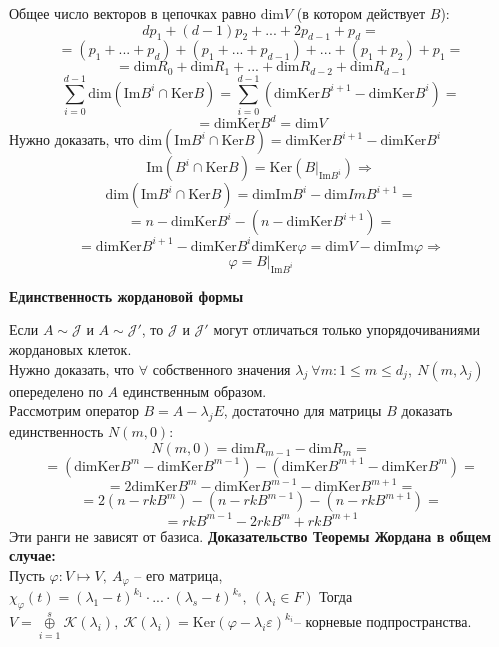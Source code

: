 \documentclass[a4paper, 12pt]{article}
\theoremstyle{definition}
\begin{document}
    Общее число векторов в цепочках равно $\text{dim}V$
    (в котором действует $B$):
    $$dp_1 + (d-1)p_2 + ... + 2p_{d-1} + p_d =$$
    $$ =(p_1 +...+ p_d) + (p_1 + ... + p_{d-1}) +...+ (p_1 + p_2)
    + p_1 = $$
    $$= \text{dim}R_0 + \text{dim}R_1 +...+ \text{dim}R_{d-2}
    + \text{dim}R_{d-1}$$
    $$\sum\limits_{i=0}^{d-1}\text{dim}(\text{Im}B^i \cap 
    \text{Ker}B) = \sum\limits_{i=0}^{d-1}(\text{dimKer}B^
    {i+1} - \text{dimKer}B^i) =$$
    $$= \text{dimKer}B^d = \text{dim}V$$
    Нужно доказать, что $\text{dim}(\text{Im}B^i \cap \text{Ker}B) = 
    \text{dimKer}B^{i+1} - \text{dimKer}B^i$
    $$\text{Im}(B^i \cap \text{Ker}B) = \text{Ker}(B|_{\text{Im}B^i}) 
    \Longrightarrow$$ $$\text{dim}(\text{Im}B^i \cap \text{Ker}B) = 
    \text{dimIm}B^i - \text{dim}ImB^{i+1}=$$ $$= n - \text{dimKer}B^i
    - (n - \text{dimKer}B^{i+1})=$$ $$= \text{dimKer}B^{i+1} - 
    \text{dimKer}B^i
    \text{dimKer}\varphi = \text{dim}V - \text{dimIm}\varphi
    \Longrightarrow $$
    $$\varphi = B|_{\text{Im}B^i}$$
    \begin{center}
        \textbf{Единственность жордановой формы} 
    \end{center}
    Если $A \sim \mathcal{J} $ и $A \sim \mathcal{J}'$,
    то $\mathcal{J} $ и $\mathcal{J} '$ могут отличаться
    только упорядочиваниями жордановых клеток.\\
    Нужно доказать, что $\forall$ собственного значения $
    \lambda_j\ \forall m: 1 \leq m \leq d_j,\ N(m,\lambda_j)$  
    опеределено по $A$ единственным образом.\\
    Рассмотрим оператор $B = A - \lambda_j E$, достаточно
    для матрицы $B$ доказать единственность $N(m, 0):$
    $$N(m,0) = \text{dim}R_{m-1} - \text{dim}R_m = $$
    $$=(\text{dimKer}B^m - \text{dimKer}B^{m-1}) - 
    (\text{dimKer}B^{m+1} - \text{dimKer}B^m) = $$
    $$ = 2\text{dimKer}B^m - \text{dimKer}B^{m-1} - \text{dimKer}B^{m+1} =$$
    $$ =2(n - rkB^m) - (n - rkB^{m-1}) - (n - rkB^{m+1}) =$$
    $$=rkB^{m-1} - 2rkB^{m} + rkB^{m+1}$$
    Эти ранги не зависят от базиса.
    \newpage
    \textbf{Доказательство Теоремы Жордана в общем случае:}\\
    Пусть $\varphi: V \longmapsto V,\ A_\varphi$ -- его 
    матрица, $\chi_\varphi(t) = (\lambda_1 - t)^{k_1}\cdot...
    \cdot (\lambda_s - t)^{k_s},\ (\lambda_i \in F)$
    Тогда $V = \overset{s}{\underset{i=1}{\oplus}}\mathcal{K}
    (\lambda_i),\  \mathcal{K}(\lambda_i) = \text{Ker}(    
    \varphi - \lambda_i \varepsilon)^{k_i}$-- корневые
    подпространства.\\
\end{document}
